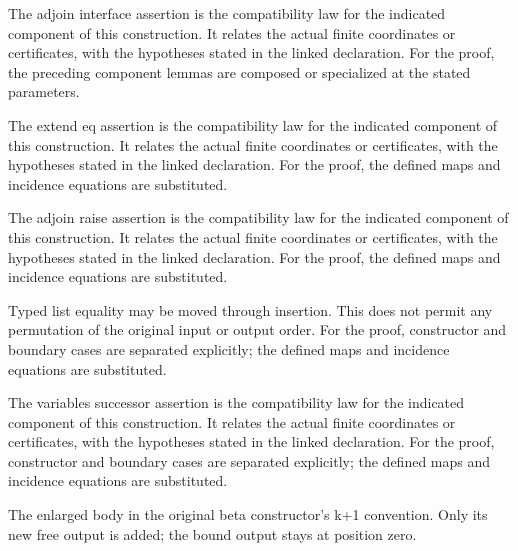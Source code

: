 The adjoin interface assertion is the compatibility law for the indicated component of this construction. It relates the actual finite coordinates or certificates, with the hypotheses stated in the linked declaration.
For the proof, the preceding component lemmas are composed or specialized at the stated parameters.
\par{}

The extend eq assertion is the compatibility law for the indicated component of this construction. It relates the actual finite coordinates or certificates, with the hypotheses stated in the linked declaration.
For the proof, the defined maps and incidence equations are substituted.
\par{}

The adjoin raise assertion is the compatibility law for the indicated component of this construction. It relates the actual finite coordinates or certificates, with the hypotheses stated in the linked declaration.
For the proof, the defined maps and incidence equations are substituted.
\par{}

Typed list equality may be moved through insertion. This does not permit any permutation of the original input or output order.
For the proof, constructor and boundary cases are separated explicitly; the defined maps and incidence equations are substituted.
\par{}

The variables successor assertion is the compatibility law for the indicated component of this construction. It relates the actual finite coordinates or certificates, with the hypotheses stated in the linked declaration.
For the proof, constructor and boundary cases are separated explicitly; the defined maps and incidence equations are substituted.
\par{}

The enlarged body in the original beta constructor's k+1 convention. Only its new free output is added; the bound output stays at position zero.
\par{}

